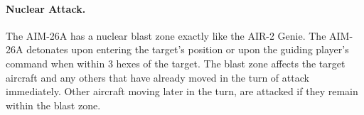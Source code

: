 \paragraph{Nuclear Attack.} The AIM-26A has a nuclear blast zone exactly like the AIR-2 Genie. The AIM-26A detonates upon entering the target's position or upon the guiding player's command when within 3 hexes of the target. The blast zone affects the target aircraft and any others that have already moved in the turn of attack immediately. Other aircraft moving later in the turn, are attacked if they remain within the blast zone.
